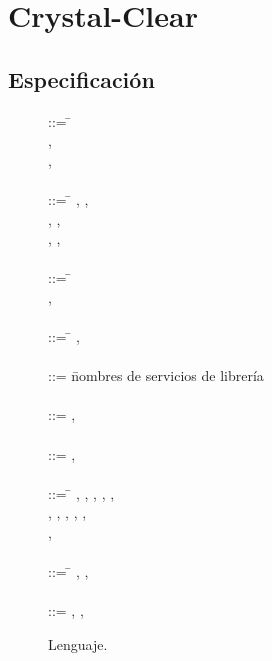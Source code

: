 \chapter{Crystal-Clear}

\section{Especificación}
\begin{figure}[H]
\centering
    \begin{tabbing}
           ::= \= \\
          \> \sep {}\\
          \> \sep {}\\\\
          
           ::= \=  \sep {}
          \sep {}\\
          \> \sep {} \sep {}\\
          \> \sep {} \sep {}
          \\\\

           ::= \=  \\
          \sep {}\\\\

           ::= \=  
          \sep {} \T{[}  \T{]}\\\\

           ::= \= nombres de servicios de librería \\\\
          
           ::=  \sep \T{[}  \T{] =} \\\\
          
           ::=  
          \sep \T{[}  \T{] =} \\\\
          
           ::= \=\;\;\T{+} \sep \T{-}
          \sep \T{*} \sep \T{/} 
          \sep \T{$\hat{}$} \sep \T{\%}\\
          \> \sep {} \sep \T{<}
          \sep \T{$\leq$} \sep \T{$>$} \sep \T{$\geq$}\\
          \> \sep \T{==}\\\\
    
           ::= \=  \sep {}
          \sep {}\\\\
          
           ::=\;\;\T{-} \sep {} \sep \T{\#}
    \end{tabbing}
  \caption{Lenguaje.}
\label{fig:test}
\end{figure}

